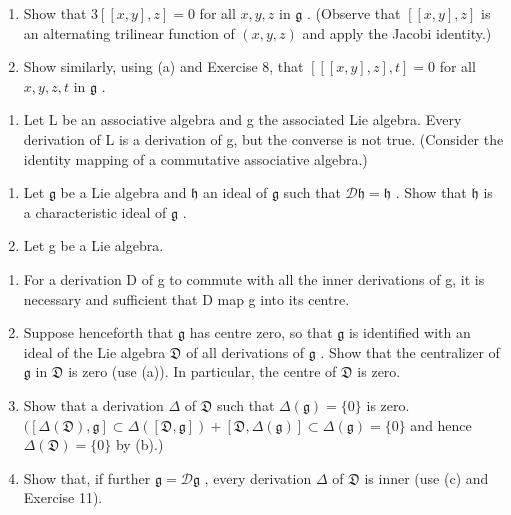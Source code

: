 \begin{enumerate}
\def\labelenumi{(\alph{enumi})}
\item
  Show that \(3[[x,y],z] = 0\) for all \(x,y,z\) in \(\mathfrak{g}\) . (Observe that \([[x,y],z]\) is an alternating trilinear function of \((x,y,z)\) and apply the Jacobi identity.)
\item
  Show similarly, using (a) and Exercise 8, that \(\left[[[x,y],z],t\right]=0\) for all \(x,y,z,t\) in \(\mathfrak{g}\) .
\end{enumerate}

\begin{enumerate}
\def\labelenumi{\arabic{enumi}.}
\setcounter{enumi}{9}
\tightlist
\item
  Let L be an associative algebra and g the associated Lie algebra. Every derivation of L is a derivation of g, but the converse is not true. (Consider the identity mapping of a commutative associative algebra.)
\end{enumerate}
\relax{}
\begin{enumerate}
\def\labelenumi{\arabic{enumi}.}
\setcounter{enumi}{10}
\item
  Let \(\mathfrak{g}\) be a Lie algebra and \(\mathfrak{h}\) an ideal of \(\mathfrak{g}\) such that \(\mathcal{D}\mathfrak{h} = \mathfrak{h}\) . Show that \(\mathfrak{h}\) is a characteristic ideal of \(\mathfrak{g}\) .
\item
  Let g be a Lie algebra.
\end{enumerate}

\begin{enumerate}
\def\labelenumi{(\alph{enumi})}
\item
  For a derivation D of g to commute with all the inner derivations of g, it is necessary and sufficient that D map g into its centre.
\item
  Suppose henceforth that \(\mathfrak{g}\) has centre zero, so that \(\mathfrak{g}\) is identified with an ideal of the Lie algebra \(\mathfrak{D}\) of all derivations of \(\mathfrak{g}\) . Show that the centralizer of \(\mathfrak{g}\) in \(\mathfrak{D}\) is zero (use (a)). In particular, the centre of \(\mathfrak{D}\) is zero.
\item
  Show that a derivation \(\Delta\) of \(\mathfrak{D}\) such that \(\Delta(\mathfrak{g}) = \{0\}\) is zero. \(([\Delta(\mathfrak{D}),\mathfrak{g}]\subset \Delta([\mathfrak{D},\mathfrak{g}]) + [\mathfrak{D},\Delta(\mathfrak{g})]\subset \Delta(\mathfrak{g}) = \{0\}\) and hence \(\Delta(\mathfrak{D}) = \{0\}\) by (b).)
\item
  Show that, if further \(\mathfrak{g} = \mathcal{D}\mathfrak{g}\) , every derivation \(\Delta\) of \(\mathfrak{D}\) is inner (use (c) and Exercise 11).
\end{enumerate}

